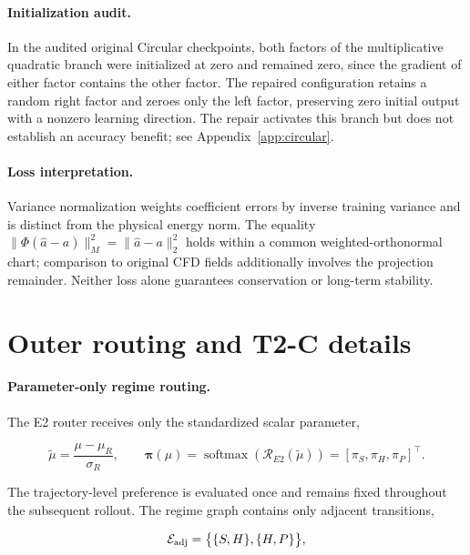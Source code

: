 \documentclass{article}
\providecommand{\DIFaddtex}[1]{{\protect\color{blue} \sf #1}} %
\providecommand{\DIFaddbegin}{} %
\providecommand{\DIFaddend}{} %
\providecommand{\DIFadd}[1]{\texorpdfstring{\DIFaddtex{#1}}{#1}} %
\begin{document}
\DIFaddbegin \paragraph{\DIFadd{Initialization audit.}}
\DIFadd{In the audited original Circular checkpoints, both factors of the
multiplicative quadratic branch were initialized at zero and remained
zero, since the gradient of either factor contains the other factor.
The repaired configuration retains a random right factor and zeroes only
the left factor, preserving zero initial output with a nonzero learning
direction. The repair activates this branch but does not establish an
accuracy benefit; see Appendix~\ref{app:circular}.
}

\paragraph{\DIFadd{Loss interpretation.}}
\DIFadd{Variance normalization weights coefficient errors by inverse training
variance and is distinct from the physical energy norm. The equality
$\|\Phi(\widehat a-a)\|_M^2=\|\widehat a-a\|_2^2$ holds within a common
weighted-orthonormal chart; comparison to original CFD fields additionally
involves the projection remainder. Neither loss alone guarantees
conservation or long-term stability.
}

\DIFaddend \section{Outer routing and T2-C details}
\label{app:routing}

\paragraph{Parameter-only regime routing.}
The E2 router receives only the standardized scalar parameter,


\begin{equation}
  \widetilde\mu
  =
  \frac{\mu-\mu_R}{\sigma_R},
  \qquad
  \bm\pi(\mu)
  =
  \operatorname{softmax}
  \left(
    \mathcal R_{E2}(\widetilde\mu)
  \right)
  =
  [\pi_S,\pi_H,\pi_P]^\top .
  \label{eq:app_e2_parameter_only}
\end{equation}


The trajectory-level preference is evaluated once and remains fixed
throughout the subsequent rollout. The regime graph contains only adjacent transitions,


\begin{equation}
  \mathcal E_{\rm adj}
  =
  \bigl\{
    \{S,H\},
    \{H,P\}
  \bigr\},
  \label{eq:app_adjacency}
\end{equation}
\end{document}
